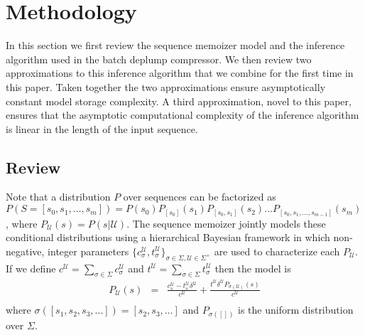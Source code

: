 \section{Methodology}
\newcommand{\T}{\ensuremath{\mathcal{T}}}
\newcommand{\N}{\ensuremath{\mathcal{N}}}
\newcommand{\M}{\ensuremath{\mathcal{M}}}
\newcommand{\PP}{\ensuremath{\mathcal{P}}}
\newcommand{\nc}{\ensuremath{nc}}
\newcommand{\RS}{\ensuremath{\mathcal{R}}}
\newcommand{\D}{\ensuremath{\mathcal{D}}}
\newcommand{\la}{\ensuremath{\leftarrow}}
\newcommand{\G}{\ensuremath{\mathcal{G}}}
\newcommand{\IS}{\ensuremath{\mathcal{I}}}
\newcommand{\Seq}{\ensuremath{\mathcal{S}}}
\newcommand{\dd}{\ensuremath{\delta}}
\newcommand{\U}{\mathcal{U}}
\label{section:methodology}



In this section we first review the sequence memoizer model and the inference algorithm used in the batch deplump compressor. We then review two approximations to this inference algorithm that we combine for the first time in this paper.  Taken together the two approximations ensure asymptotically constant model storage complexity.  A third approximation, novel to this paper, ensures that the asymptotic computational complexity of the inference algorithm is linear in the length of the input sequence.

\subsection{Review}

Note that a distribution $P$ over sequences can be factorized as $P(S = [s_0, s_1, \ldots, s_m]) = P(s_0)P_{[s_0]}(s_1)P_{[s_0,s_1]}(s_2) \ldots P_{[s_0,s_1,\ldots,s_{m-1}]}(s_m)$, where $P_\U (s) = P(s | \U)$.  The sequence memoizer \citep{Wood2009} jointly models these conditional distributions using a hierarchical Bayesian framework in which non-negative, integer parameters $\{ c^\U_\sigma, t^\U_\sigma \}_{\sigma \in \Sigma, \U \in \Sigma^{+}}$ are used to characterize each $P_\U$.  If we define $c^\U = \sum_{\sigma \in \Sigma} c^\U_\sigma$ and $t^\U = \sum_{\sigma \in \Sigma} t^\U_\sigma$ then the model is
%
\begin{eqnarray*}
	P_\U(s) &=& \frac{c^\U_s - t^\U_s \delta^\U}{c^\U} +  \frac{t^\U \delta^\U  P_{ \sigma(\U)}(s) }{c^\U} \\
\end{eqnarray*}
%
\noindent where $\sigma([s_1, s_2, s_3, \ldots]) = [s_2,s_3, \ldots]$ and $P_{\sigma([])}$ is the uniform distribution over $\Sigma$.

